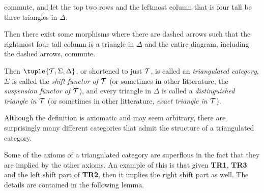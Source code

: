 \begin{definition}
\begin{enumerate}[label={(\bfseries TR\arabic*)}]
{\begin{center}
            \end{center}
            commute, and let the top two rows and the leftmost column that is four tall be three triangles in \( \Delta \).

            Then there exist some morphisms where there are dashed arrows such that the rightmost four tall column is a triangle in \( \Delta \) and the entire diagram, including the dashed arrows, commute.
        }
    \end{enumerate}

    Then \( \tuple{ \Tc, \Sigma, \Delta } \), or shortened to just \( {\mathcal{T}} \), is called an \emph{triangulated category}, \( \Sigma \) is called the \emph{shift functor of \( {\mathcal{T}} \)} (or sometimes in other litterature, the \emph{suspension functor of \( {\mathcal{T}} \)}), and every triangle in \( \Delta \) is called a \emph{distinguished triangle in \( {\mathcal{T}} \)} (or sometimes in other litterature, \emph{exact triangle in \( {\mathcal{T}} \)}).
\end{definition}

Although the definition is axiomatic and may seem arbitrary, there are surprisingly many different categories that admit the structure of a triangulated category.

Some of the axioms of a triangulated category are superflous in the fact that they are implied by the other axioms. An example of this is that given {\bf TR1}, {\bf TR3} and the left shift part of {\bf TR2}, then it implies the right shift part as well. The details are contained in the following lemma.

